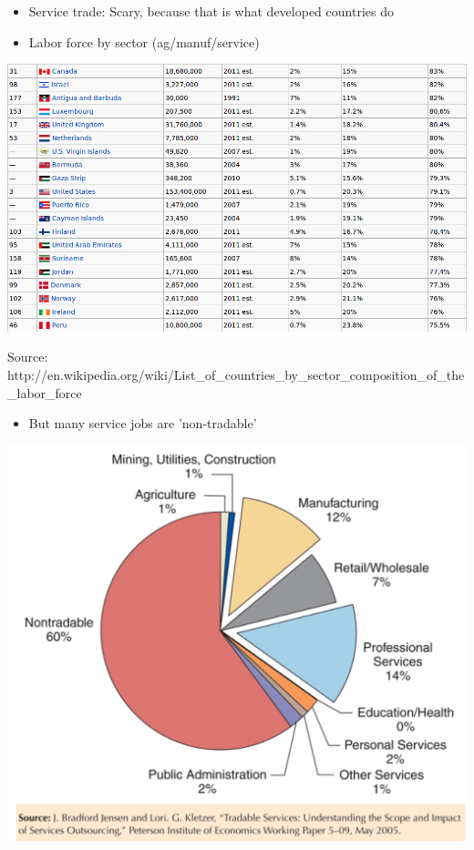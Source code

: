 \documentclass[ignorenonframetext,]{beamer}
\begin{document}
\begin{frame}

    \begin{itemize}
        \item Service trade: Scary, because that is what developed countries do
        \item Labor force by sector (ag/manuf/service)
    \end{itemize}
    
    \includegraphics[scale=0.30]{sector_comp_of_labor_force.png}

    {\tiny Source: http://en.wikipedia.org/wiki/List\_of\_countries\_by\_sector\_composition\_of\_the\_labor\_force}

\end{frame}

\begin{frame}

   \begin{itemize}
        \item But many service jobs are 'non-tradable'
    \end{itemize}

    \includegraphics[scale=0.20]{tradable_services.png}

\end{frame}
\end{document}
